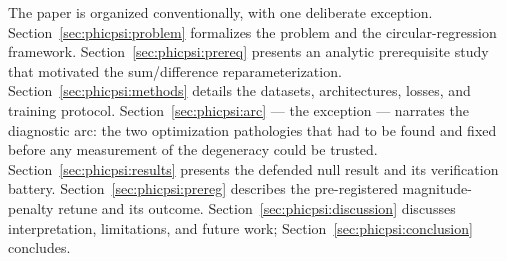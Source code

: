 The paper is organized conventionally, with one deliberate exception.
Section~\ref{sec:phicpsi:problem} formalizes the problem and the circular-regression framework.
Section~\ref{sec:phicpsi:prereq} presents an analytic prerequisite study that motivated the sum/difference reparameterization.
Section~\ref{sec:phicpsi:methods} details the datasets, architectures, losses, and training protocol.
Section~\ref{sec:phicpsi:arc} --- the exception --- narrates the diagnostic arc: the two optimization pathologies that had to be found and fixed before any measurement of the degeneracy could be trusted.
Section~\ref{sec:phicpsi:results} presents the defended null result and its verification battery.
Section~\ref{sec:phicpsi:prereg} describes the pre-registered magnitude-penalty retune and its outcome.
Section~\ref{sec:phicpsi:discussion} discusses interpretation, limitations, and future work; Section~\ref{sec:phicpsi:conclusion} concludes.
